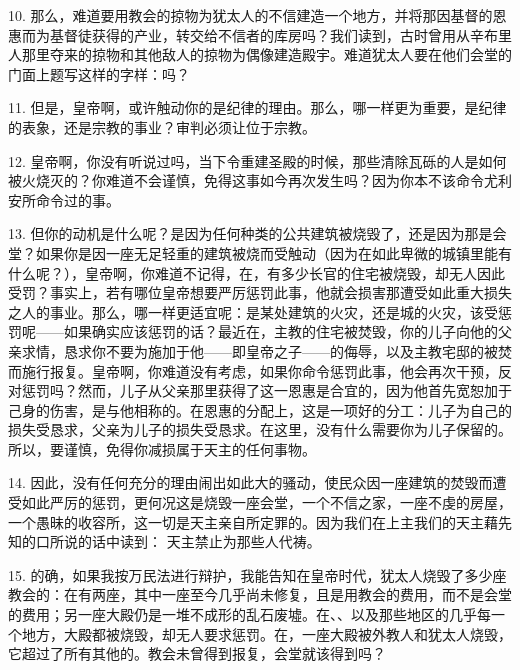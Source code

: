 10. 那么，难道要用教会的掠物为犹太人的不信建造一个地方，并将那因基督的恩惠而为基督徒获得的产业，转交给不信者的库房吗？我们读到，古时曾用从辛布里人那里夺来的掠物和其他敌人的掠物为偶像建造殿宇。难道犹太人要在他们会堂的门面上题写这样的字样：吗？\par

11. 但是，皇帝啊，或许触动你的是纪律的理由。那么，哪一样更为重要，是纪律的表象，还是宗教的事业？审判必须让位于宗教。\par

12. 皇帝啊，你没有听说过吗，当下令重建圣殿的时候，那些清除瓦砾的人是如何被火烧灭的？你难道不会谨慎，免得这事如今再次发生吗？因为你本不该命令尤利安所命令过的事。\par

13. 但你的动机是什么呢？是因为任何种类的公共建筑被烧毁了，还是因为那是会堂？如果你是因一座无足轻重的建筑被烧而受触动（因为在如此卑微的城镇里能有什么呢？），皇帝啊，你难道不记得，在，有多少长官的住宅被烧毁，却无人因此受罚？事实上，若有哪位皇帝想要严厉惩罚此事，他就会损害那遭受如此重大损失之人的事业。那么，哪一样更适宜呢：是某处建筑的火灾，还是城的火灾，该受惩罚呢——如果确实应该惩罚的话？最近在，主教的住宅被焚毁，你的儿子向他的父亲求情，恳求你不要为施加于他——即皇帝之子——的侮辱，以及主教宅邸的被焚而施行报复。皇帝啊，你难道没有考虑，如果你命令惩罚此事，他会再次干预，反对惩罚吗？然而，儿子从父亲那里获得了这一恩惠是合宜的，因为他首先宽恕加于己身的伤害，是与他相称的。在恩惠的分配上，这是一项好的分工：儿子为自己的损失受恳求，父亲为儿子的损失受恳求。在这里，没有什么需要你为儿子保留的。所以，要谨慎，免得你减损属于天主的任何事物。\par

14. 因此，没有任何充分的理由闹出如此大的骚动，使民众因一座建筑的焚毁而遭受如此严厉的惩罚，更何况这是烧毁一座会堂，一个不信之家，一座不虔的房屋，一个愚昧的收容所，这一切是天主亲自所定罪的。因为我们在上主我们的天主藉先知的口所说的话中读到： 天主禁止为那些人代祷。\par

15. 的确，如果我按万民法进行辩护，我能告知在皇帝时代，犹太人烧毁了多少座教会的：在有两座，其中一座至今几乎尚未修复，且是用教会的费用，而不是会堂的费用；另一座大殿仍是一堆不成形的乱石废墟。在、、以及那些地区的几乎每一个地方，大殿都被烧毁，却无人要求惩罚。在，一座大殿被外教人和犹太人烧毁，它超过了所有其他的。教会未曾得到报复，会堂就该得到吗？\par

